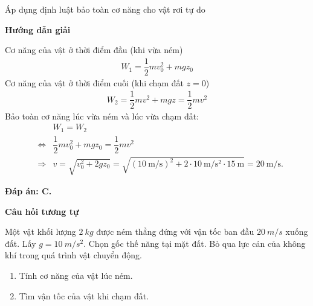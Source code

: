 \begin{dang}{Áp dụng định luật bảo toàn cơ năng cho vật rơi tự do }
	{	\begin{center}
			\textbf{Hướng dẫn giải}
		\end{center}
		
		Cơ năng của vật ở thời điểm đầu (khi vừa ném)
		\begin{align*}
			W_1=\dfrac{1}{2}mv_0^2+mgz_0
		\end{align*}
		Cơ năng của vật ở thời điểm cuối (khi chạm đất $z=0$)
		\begin{align*}
			W_2=\dfrac{1}{2}mv^2+mgz=\dfrac{1}{2}mv^2
		\end{align*}
		Bảo toàn cơ năng lúc vừa ném và lúc vừa chạm đất:
		\begin{eqnarray*}
			&&W_1=W_2\\
			&\Leftrightarrow&\dfrac{1}{2}mv_0^2+mgz_0=\dfrac{1}{2}mv^2\\
			&\Rightarrow& v=\sqrt{v_0^2+2gz_0}=\sqrt{(\SI{10}{\meter/\second})^2+2\cdot\SI{10}{\meter/\second^2}\cdot\SI{15}{\meter}}=\SI{20}{\meter/\second}.
		\end{eqnarray*}
		
		\textbf{Đáp án: C.}
		
		\begin{center}
			\textbf{Câu hỏi tương tự}
		\end{center}
		
		Một vật khối lượng $\SI{2}{kg}$ được ném thẳng đứng với vận tốc ban đầu $\SI{20}{m/s}$ xuống đất. Lấy $g=\SI{10}{m/s^2}$. Chọn gốc thế năng tại mặt đất. Bỏ qua lực cản của không khí trong quá trình vật chuyển động.
		\begin{enumerate}[label=\alph*)]
			\item Tính cơ năng của vật lúc ném.
			\item Tìm vận tốc của vật khi chạm đất.
		\end{enumerate}
		
}
\end{dang}
